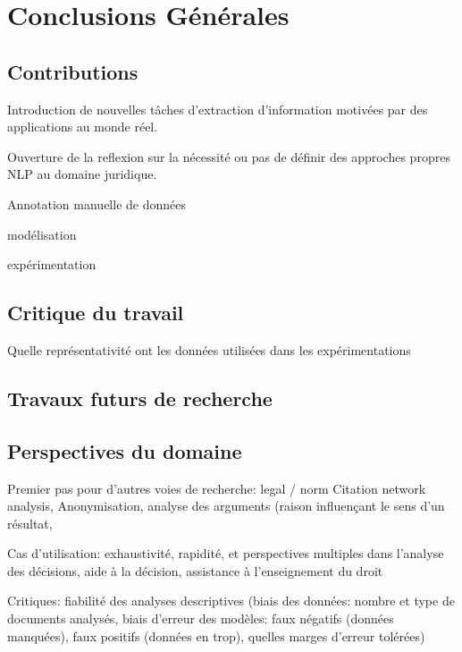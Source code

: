 \chapter*{Conclusions Générales}
\label{chap:conclusion}

\section{Contributions}
\label{sec:conclusion:contributions}
Introduction de nouvelles tâches d'extraction d'information motivées par des applications au monde réel.

Ouverture de la reflexion sur la nécessité ou pas de définir des approches propres NLP au domaine juridique.

Annotation manuelle de données

modélisation

expérimentation


\section{Critique du travail}
\label{sec:conclusion:critique}
Quelle représentativité ont les données utilisées dans les expérimentations




\section{Travaux futurs de recherche}
\label{sec:conclusion:extensions}

\section{Perspectives du domaine}
\label{sec:conclusion:perspectives}
Premier pas pour d'autres voies de recherche: legal / norm Citation network analysis, Anonymisation, analyse des arguments (raison influençant le sens d'un résultat, 

Cas d'utilisation: exhaustivité, rapidité, et perspectives multiples dans l'analyse des décisions, aide à la décision, assistance à l'enseignement du droit

Critiques: fiabilité des analyses descriptives (biais des données: nombre et type de documents analysés, biais d'erreur des modèles: faux négatifs (données manquées), faux positifs (données en trop), quelles marges d'erreur tolérées)
